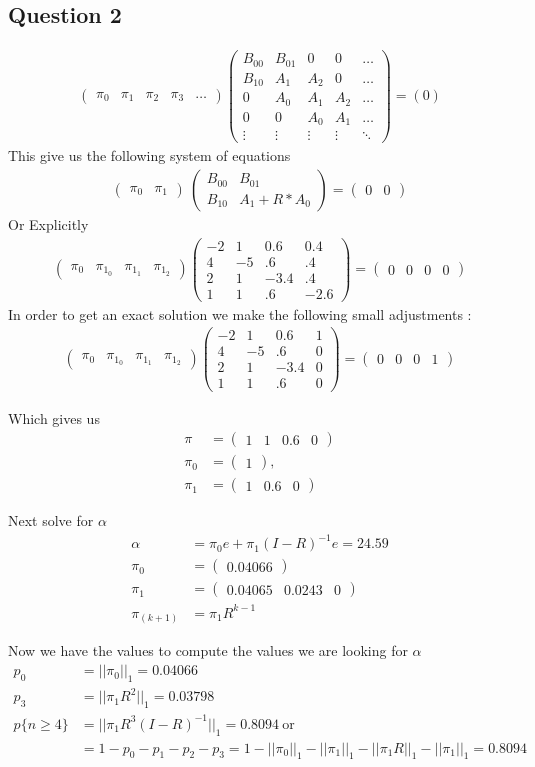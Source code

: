 \documentclass[fleqn]{article}
\newcommand{\mm}[1]{\begin{pmatrix}#1\end{pmatrix}}
\newcommand{\nn}[1]{ \begin{align*}#1\end{align*}}
\begin{document}
 \subsection*{Question 2}
\nn{
	 \mm{ \pi_0 & \pi_1 & \pi_2 & \pi_3 & \ldots }
	 \mm{
	  	B_{00} & B_{01} & 0 & 0 & \ldots\\
	  	B_{10} & A_1 & A_2 & 0  & \ldots\\ 
	  	0      & A_0 & A_1 & A_2 & \ldots\\ 
	  	0      & 0   & A_0 & A_1 & \ldots\\
	 	\vdots&\vdots&\vdots&\vdots&\ddots  
	 } = (0) 
}
This give us the following system of equations
\nn{
	\mm{\pi_0&\pi_1}\ \mm{
		 B_{00} & B_{01} \\ 
		 B_{10} & A_{1} + R * A_{0}
	}=\mm{0&0}
}
Or Explicitly 
\nn{
	\mm{\pi_{0} & \pi_{1_0} & \pi_{1_1} & \pi_{1_2}} 
 	\mm{-2&1&0.6&0.4\\ 4&-5&.6&.4\\2&1&-3.4&.4\\1&1&.6&-2.6} = \mm{0&0&0&0}
}
In order to get an exact solution we make the following small adjustments : 
 \nn{
 	\mm{\pi_{0} & \pi_{1_0} & \pi_{1_1} & \pi_{1_2}} 
 	\mm{-2&1&0.6&1\\ 4&-5&.6&0\\2&1&-3.4&0\\1&1&.6&0} = \mm{0&0&0&1}
 }
 
Which gives us
\nn{
    \pi   &= \mm{ 1&1&0.6&0} \\
    \pi_0 &= \mm{1}, \\
    \pi_1 &= \mm{1&0.6&0}
}

Next solve for $\alpha$ 
\nn{
    \alpha &= \pi_0 e  + \pi_1( I - R )^{-1}e = 24.59\\
    \pi_0 &= \mm{0.04066}\\
    \pi_1 &= \mm{0.04065 & 0.0243 & 0 }\\
    \pi_{(k+1)} &= \pi_{1}R^{k-1} 
}
 
Now we have the values to compute the values we are
looking for $\alpha$
\nn{
     p_0           &= ||\pi_{0}||_1 = \boxed{ 0.04066 } \\
     p_3           &= ||\pi_1R^2||_1 = \boxed { 0.03798 } \\
     p\{n \geq 4\} &= ||\pi_1R^{3}(I-R)^{-1}||_1 = 0.8094 \ \mbox{or}\\
      &=1 - p_0 - p_1 - p_2 - p_3 = 1 - ||\pi_{0}||_1 -
    ||\pi_{1}||_1 - ||\pi_{1}R||_1 - ||\pi_{1}||_1 =\boxed{0.8094}
 }
\end{document}
